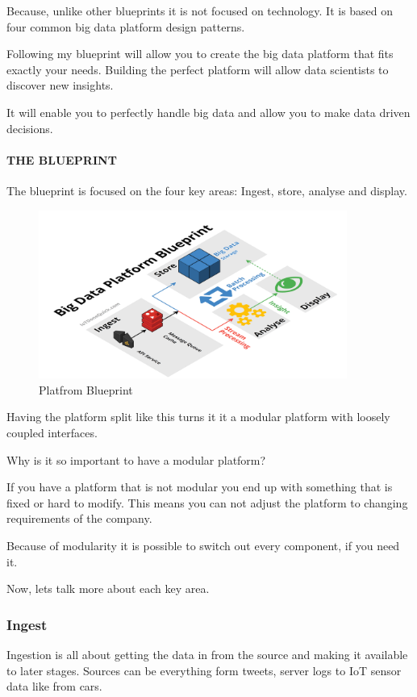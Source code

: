 \documentclass[12pt]{scrartcl} %
\begin{document}
Because, unlike other blueprints it is not focused on technology. It is based on four common big data platform design patterns.

Following my blueprint will allow you to create the big data platform that fits exactly your needs. Building the perfect platform will allow data scientists to discover new insights.

It will enable you to perfectly handle big data and allow you to make data driven decisions.

\paragraph{THE BLUEPRINT}
The blueprint is focused on the four key areas: Ingest, store, analyse and display.

\begin{figure}[htbp] 
  \centering
     \includegraphics[width=0.9\textwidth]{images/Big-Data-Platform-Blueprint-Title-Original.png}
  \caption{Platfrom Blueprint}
  \label{fig:Bild1}
\end{figure}


Having the platform split like this turns it it a modular platform with loosely coupled interfaces.

Why is it so important to have a modular platform?

If you have a platform that is not modular you end up with something that is fixed or hard to modify. This means you can not adjust the platform to changing requirements of the company.

Because of modularity it is possible to switch out every component, if you need it.

Now, lets talk more about each key area.

\subsubsection{Ingest}
Ingestion is all about getting the data in from the source and making it available to later stages. Sources can be everything form tweets, server logs to IoT sensor data like from cars.
\end{document}
